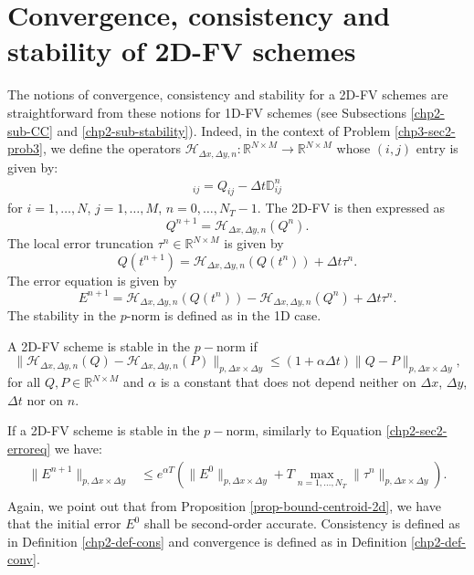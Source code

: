 \section{Convergence, consistency and stability of 2D-FV schemes}
\label{chp3-CCS}
The notions of convergence, consistency and stability for a 2D-FV schemes
are straightforward from these notions for 1D-FV schemes
(see Subsections \ref{chp2-sub-CC} and \ref{chp2-sub-stability}).
Indeed, in the context of Problem \ref{chp3-sec2-prob3}, we define the operators
$\mathcal{H}_{\Delta x ,\Delta y,n}: \mathbb{R}^{N \times M} \to \mathbb{R}^{N \times M}$ whose $(i,j)$ entry is given by:
\begin{align*}
	[\mathcal{H}_{\Delta x ,\Delta y,n}(Q)]_{ij} = Q_{ij} - \Delta t\mathbb{D}_{ij}^n
\end{align*}
for $i=1, \ldots, N$, $j=1, \ldots, M$, $n=0, \ldots, N_T-1$. The 2D-FV is then expressed as
\begin{equation*}
	Q^{n+1} = \mathcal{H}_{\Delta x ,\Delta y,n}(Q^n).
\end{equation*}
The local error truncation $\tau^n \in \mathbb{R}^{N \times M}$ is given by
\begin{equation*}
	Q(t^{n+1}) = \mathcal{H}_{\Delta x ,\Delta y,n}(Q(t^n)) + \Delta t \tau^n.
\end{equation*}
The error equation is given by
\begin{equation}
	E^{n+1} = \mathcal{H}_{\Delta x ,\Delta y,n}(Q(t^n)) - \mathcal{H}_{\Delta x ,\Delta y,n}(Q^n) +  \Delta t \tau^n.
\end{equation}
The stability in the $p$-norm is defined as in the 1D case.
\begin{definition}
	A 2D-FV scheme is stable in the $p-$norm if 
	\begin{equation}
		\|\mathcal{H}_{\Delta x ,\Delta y,n}(Q) - \mathcal{H}_{\Delta x ,\Delta y,n}(P)\|_{p,\Delta x \times \Delta y} \leq (1+\alpha \Delta t)  \|Q-P\|_{p,\Delta x \times \Delta y},
	\end{equation}
	for all $Q, P \in \mathbb{R}^{N\times M}$ and $\alpha$ is a constant
	that does not depend neither on $\Delta x$, $\Delta y$, $\Delta t$ nor on $n$.
\end{definition}
If a 2D-FV scheme is stable in the $p-$norm, similarly to Equation \eqref{chp2-sec2-erroreq} we have:
\begin{align*}
		\|E^{n+1}\|_{p,\Delta x \times \Delta y} &\leq e^{\alpha T}(\|E^0\|_{p,\Delta x \times \Delta y} + T\max_{n=1, \ldots, N_T}\|\tau^n\|_{p,\Delta x \times \Delta y}).\\
\end{align*}
Again, we point out that from Proposition \ref{prop-bound-centroid-2d}, we have that the initial error $E^0$ shall be second-order accurate.
Consistency is defined as in Definition \ref{chp2-def-cons} and convergence is defined as in Definition \ref{chp2-def-conv}.

